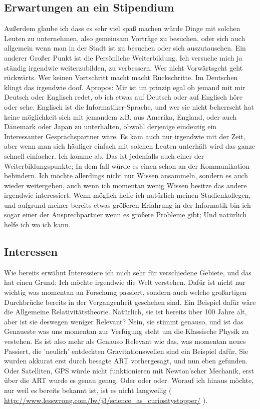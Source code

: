 \documentclass{scrartcl}
\begin{document}
\subsection*{Erwartungen an ein Stipendium}

Außerdem glaube ich dass es sehr viel spaß machen würde Dinge mit solchen Leuten zu unternehmen,
also gemeinsam Vorträge zu besuchen, oder sich auch allgemein wenn man in der Stadt ist zu besuchen
oder sich auszutauschen. Ein anderer Großer Punkt ist die Persönliche Weiterbildung. Ich versuche
mich ja ständig irgendwie weiterzubilden, zu verbessern. Wer nicht Vorwärtsgeht geht rückwärts.
Wer keinen Vortschritt macht macht Rückschritte. Im Deutschen klingt das irgendwie doof. Apropos:
Mir ist im prinzip egal ob jemand mit mir Deutsch oder Englisch redet, ob ich etwas auf Deutsch
oder auf Englisch höre oder sehe. Englisch ist die Informatiker-Sprache, und wer sie nicht
beherrscht hat keine möglichkeit sich mit jemandem z.B. aus Amerika, England, oder auch Dänemark
oder Japan zu unterhalten, obwohl derjenige eindeutig ein Interessanter Gesprächspartner wäre.
Es kam auch nur irgendwie mit der Zeit, aber wenn man sich häufiger einfach mit solchen Leuten
unterhält wird das ganze schnell einfacher. Ich komme ab. Das ist jedenfalls auch einer der
Weiterbildungspunkte; In dem fall würde es einen schon an der Kommunikation behindern. Ich möchte
allerdings nicht nur Wissen ansammeln, sondern es auch wieder weitergeben, auch wenn ich momentan
wenig Wissen besitze das andere irgendwie interessiert. Wenn möglich helfe ich natürlich meinen
Studienkollegen, und aufgrund meiner bereits etwas größeren Erfahrung in der Informatik bin ich
sogar einer der Ansprechpartner wenn es größere Probleme gibt; Und natürlich helfe ich wo ich kann. \\

\subsection*{Interessen}

Wie bereits erwähnt Interessiere ich mich sehr für verschiedene Gebiete, und das hat einen Grund:
Ich möchte irgendwie die Welt verstehen. Dafür ist nicht nur wichtig was momentan an Forschung
passiert, sondern auch welche großartigen Durchbrüche bereits in der Vergangenheit geschehen sind.
Ein Beispiel dafür wäre die Allgemeine Relativitätstheorie. Natürlich, sie ist bereits über 100
Jahre alt, aber ist sie deswegen weniger Relevant? Nein, sie stimmt genauso, und ist das Genaueste
was uns momentan zur Verfügung steht um die Klassische Physik zu vestehen. Es ist also mehr als
Genauso Relevant wie das, was momentan neues Passiert, die 'neulich' entdeckten Gravitationswellen
sind ein Beispiel dafür, Sie wurden akkurat erst durch besagte ART vorhergesagt, und nun eben gefunden.
Oder Satelliten, GPS würde nicht funktionieren mit Newton'scher Mechanik, erst über die ART wurde
es genau genug. Oder oder oder. Worauf ich hinaus möchte, nur weil es bereits bekannt ist, ist es
nicht langweilig ( \url{http://www.lesswrong.com/lw/j3/science\_as\_curiositystopper/} ). \\
\end{document}
